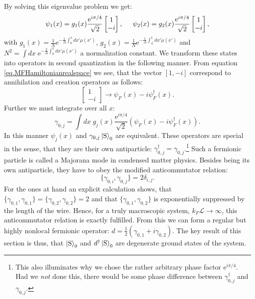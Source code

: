 By solving this eigenvalue problem we get:
\begin{equation}
\psi_1(x) = g_1(x)\frac{\text{e}^{i\pi/4}}{\sqrt{2}}\begin{bmatrix} 1 \\ -i \end{bmatrix}, \hspace{0.5cm} \psi_2(x) = g_2(x)\frac{\text{e}^{i\pi/4}}{\sqrt{2}}\begin{bmatrix} 1 \\ -i \end{bmatrix}, \nonumber
\end{equation}
with $g_1(x) = \frac{1}{N}\text{e}^{-\frac{1}{\Delta}\int_{0}^{x} dx' \mu(x')}$, $g_2(x) = \frac{1}{N}\text{e}^{-\frac{1}{\Delta}\int_{\mathcal{L}}^{x} dx' \mu(x')}$ and $N^2 = \int dx \; \text{e}^{-\frac{2}{\Delta}\int_{0}^{x} dx' \mu(x')}$ a normalization constant. We transform these states into operators in second quantization in the following manner. From equation \eqref{eq.MFHamiltonianrealspace} we see, that the vector $[1, -i]$ correspond to annihilation and creation operators as follows:
\begin{equation}
\begin{bmatrix} 1 \\ -i \end{bmatrix} \to \psi_F(x) - i\psi^\dagger_F(x). \nonumber
\end{equation}
Further we must integrate over all $x$:
\begin{equation}
\gamma_{0,j} = \int dx \; g_j(x) \frac{\text{e}^{i\pi/4}}{\sqrt{2}}(\psi_F(x) - i\psi^\dagger_F(x)).
\label{eq.Majoranaedgemodedef} 
\end{equation}
In this manner $\psi_j(x)$ and $\gamma_{0,j}\ket{\text{S}}_0$ are equivalent. These operators are special in the sense, that they are their own antiparticle: $\gamma_{0,j}^\dagger = \gamma_{0,j}$.\footnote{This also illuminates why we chose the rather arbitrary phase factor $\text{e}^{i\pi/4}$. Had we \textit{not} done this, there would be some phase difference between $\gamma^\dagger_{0,j}$ and $\gamma_{0,j}$.} Such a fermionic particle is called a Majorana mode in condensed matter physics. Besides being its own antiparticle, they have to obey the modified anticommutator relation:
\begin{equation}
\{\gamma_{0,i}, \gamma_{0,j} \} = 2\delta_{i,j}. \nonumber
\end{equation}
For the ones at hand an explicit calculation shows, that $\{\gamma_{0,1}, \gamma_{0,1} \} = \{\gamma_{0,2}, \gamma_{0,2} \} = 2$ and that $\{\gamma_{0,1}, \gamma_{0,2} \}$ is exponentially suppressed by the length of the wire. Hence, for a truly macroscopic system, $k_F\mathcal{L} \to \infty$, this anticommutator relation is exactly fulfilled. From this we can form a regular but highly nonlocal fermionic operator: $d = \frac{1}{2}(\gamma_{0,1} + i\gamma_{0,2})$. The key result of this section is thus, that $\ket{\text{S}}_0$ and $d^\dagger\ket{\text{S}}_0$ are degenerate ground states of the system. 


